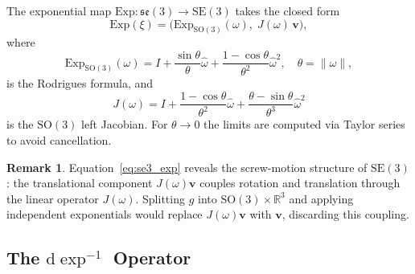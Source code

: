 \documentclass[a4paper,10pt]{article}
\newcommand{\SO}{\mathrm{SO}(3)}
\newcommand{\SE}{\mathrm{SE}(3)}
\newcommand{\se}{\mathfrak{se}(3)}
\newcommand{\Exp}{\mathrm{Exp}}
\newcommand{\dexp}{\mathrm{d}\exp}
\newcommand{\R}{\mathbb{R}}
\newcommand{\norm}[1]{\left\lVert #1 \right\rVert}
\newcommand{\skw}[1]{\widehat{#1}}
\theoremstyle{definition}
\newtheorem{remark}{Remark}
\begin{document}
The exponential map $\Exp : \se \to \SE$ takes the closed form
\begin{equation}
  \Exp(\xi) = \bigl(\Exp_{\SO}(\omega),\; J(\omega)\,\mathbf{v}\bigr),
  \label{eq:se3_exp}
\end{equation}
where
\begin{equation}
  \Exp_{\SO}(\omega) = I + \frac{\sin\theta}{\theta}\skw{\omega}
                         + \frac{1-\cos\theta}{\theta^2}\skw{\omega}^2,
  \quad \theta = \norm{\omega},
  \label{eq:so3_exp}
\end{equation}
is the Rodrigues formula, and
\begin{equation}
  J(\omega) = I
    + \frac{1-\cos\theta}{\theta^2}\skw{\omega}
    + \frac{\theta - \sin\theta}{\theta^3}\skw{\omega}^2
  \label{eq:so3_left_jac}
\end{equation}
is the $\SO$ left Jacobian.  For $\theta \to 0$ the limits are computed via
Taylor series to avoid cancellation.

\begin{remark}
Equation~\eqref{eq:se3_exp} reveals the screw-motion structure of $\SE$:
the translational component $J(\omega)\mathbf{v}$ couples rotation and translation
through the linear operator $J(\omega)$.  Splitting $g$ into $\SO \times \R^3$
and applying independent exponentials would replace $J(\omega)\mathbf{v}$ with
$\mathbf{v}$, discarding this coupling.
\end{remark}

\subsection{The $\dexp^{-1}$ Operator}
\end{document}
